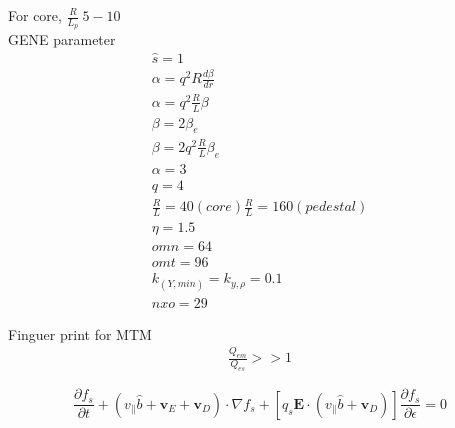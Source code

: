 For core, $\frac{R}{L_p}~5-10$\\


GENE parameter
\begin{eqnarray}
    \hat{s}=1\\
    \alpha=q^2 R \frac{d\beta }{dr}\\
    \alpha=q^2 \frac{R}{L} \beta \\
    \beta = 2\beta_e \\
    \beta = 2q^2\frac{R}{L}\beta_e\\
    \alpha =3\\
    q=4\\
    \frac{R}{L}=40(core)
    \frac{R}{L}=160 (pedestal)\\
    \eta =1.5\\
    omn=64\\
    omt=96\\
    k_(Y,min)=k_{y,\rho}=0.1\\
    nxo=29
\end{eqnarray}

Finguer print for MTM
\begin{eqnarray}
    \frac{Q_{em}}{Q_{es}}>>1
\end{eqnarray}

\begin{equation}
    \frac{\partial f_s}{\partial t} + (v_{\parallel}\hat{b}+\textbf{v}_E+\textbf{v}_D)\cdot\nabla f_s + [q_s\textbf{E}\cdot(v_{\parallel}\hat{b}+\textbf{v}_D)]\frac{\partial f_s}{\partial \epsilon}=0
\label{eq:dke}
\end{equation}

